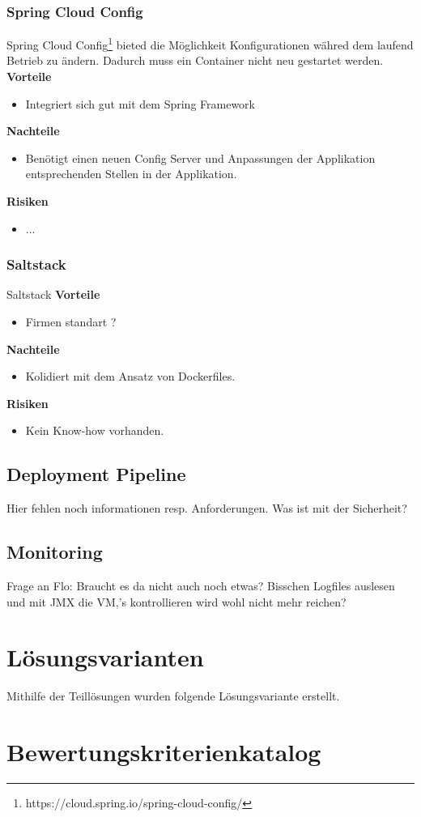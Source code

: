 \subsubsection{Spring Cloud Config}

Spring Cloud Config\footnote{https://cloud.spring.io/spring-cloud-config/} bieted die Möglichkeit Konfigurationen währed dem laufend Betrieb zu ändern. Dadurch muss ein Container nicht neu gestartet werden.\newline
\newline
\textbf{Vorteile}
\begin{itemize}
	\item Integriert sich gut mit dem Spring Framework
\end{itemize}
\textbf{Nachteile}
\begin{itemize}
	\item Benötigt einen neuen Config Server und Anpassungen der Applikation entsprechenden Stellen in der Applikation.
\end{itemize}
\textbf{Risiken}
\begin{itemize}
	\item ...
\end{itemize}
\subsubsection{Saltstack}

Saltstack\newline
\newline
\textbf{Vorteile}
\begin{itemize}
	\item Firmen standart ?
\end{itemize}
\textbf{Nachteile}
\begin{itemize}
	\item Kolidiert mit dem Ansatz von Dockerfiles.
\end{itemize}
\textbf{Risiken}
\begin{itemize}
	\item Kein Know-how vorhanden.
\end{itemize}

\subsection{Deployment Pipeline}

Hier fehlen noch informationen resp. Anforderungen. Was ist mit der Sicherheit?

\subsection{Monitoring}

Frage an Flo: Braucht es da nicht auch noch etwas? Bisschen Logfiles auslesen und mit JMX die VM,'s kontrollieren wird wohl nicht mehr reichen?

\section{Lösungsvarianten}

Mithilfe der Teillösungen wurden folgende Lösungsvariante erstellt. 

\section{Bewertungskriterienkatalog}

